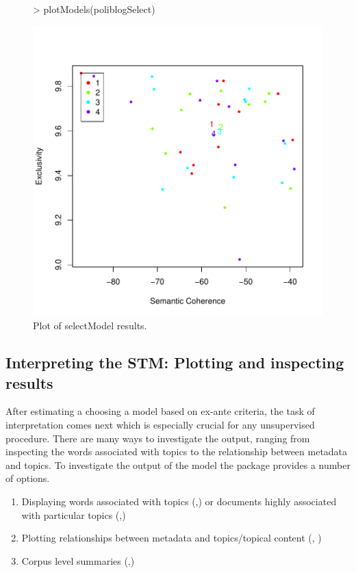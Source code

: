 \documentclass[nojss]{jss}
\begin{document}
\begin{figure}[t!]
\begin{center}
\begin{Schunk}
\begin{Sinput}
> plotModels(poliblogSelect)
\end{Sinput}
\end{Schunk}
\includegraphics{stmVignette-009}
\caption{Plot of selectModel results.}
\label{fig:select}
\end{center}
\end{figure}


\subsection{Interpreting the STM: Plotting and inspecting results}

After estimating a choosing a model based on ex-ante criteria, the task of interpretation comes next which is especially crucial for any unsupervised procedure. There are many ways to investigate the output, ranging from inspecting the words associated with topics to the relationship between metadata and topics. To investigate the output of the model the  package provides a number of options.
\begin{enumerate}
\item Displaying words associated with topics (,) or documents highly associated with particular topics (,)
\item Plotting relationships between metadata and topics/topical content (, )
\item Corpus level summaries (,)
\end{enumerate}
\end{document}
